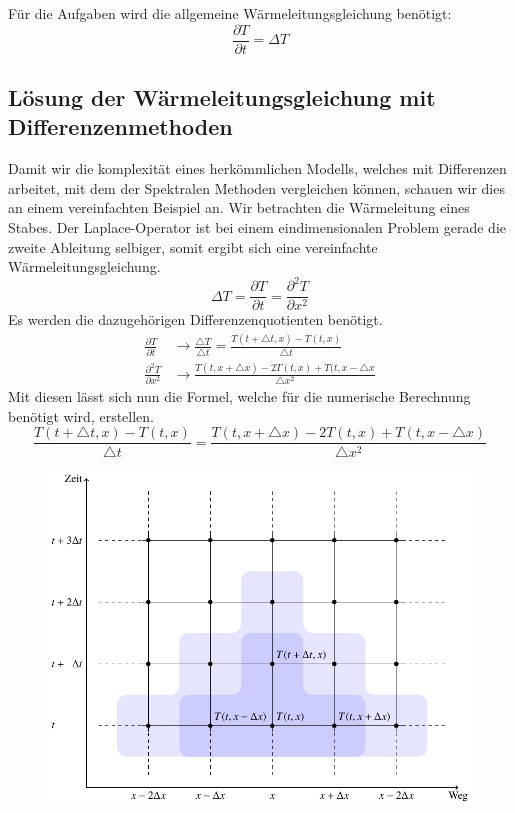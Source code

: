 \begin{refsection}
Für die Aufgaben wird die allgemeine Wärmeleitungsgleichung benötigt:
\begin{equation}
\frac{\partial T}{\partial t} =  \Delta T 
\label{klima:bsp:pdgl}
\end{equation}



\subsection{Lösung der Wärmeleitungsgleichung mit Differenzenmethoden}
Damit wir die komplexität eines herkömmlichen Modells, welches mit Differenzen arbeitet, mit dem der Spektralen Methoden vergleichen können, schauen wir dies an einem vereinfachten Beispiel an. Wir betrachten die Wärmeleitung eines Stabes.
Der Laplace-Operator ist bei einem eindimensionalen Problem gerade die zweite Ableitung selbiger, somit ergibt sich eine vereinfachte Wärmeleitungsgleichung.
\begin{equation}
\Delta T = \frac{\partial T}{\partial t}=\dfrac{\partial^2 T}{\partial x^2}
\end{equation}
Es werden die dazugehörigen Differenzenquotienten benötigt.
\begin{align}
\frac{\partial T}{\partial t}
&\rightarrow
\frac{\triangle T}{\triangle t}=
\frac{T(t+\triangle t,x)-T(t,x)}{\triangle t}
\\
\frac{\partial^2 T}{\partial x^2}
&\rightarrow
\frac{T(t,x+\triangle x)-2T(t,x)+T(t,x-\triangle x}{\triangle x^2}
\end{align}
Mit diesen lässt sich nun die Formel, welche für die numerische Berechnung benötigt wird, erstellen.
\begin{equation}
\frac{T(t+\triangle t,x)-T(t,x)}{\triangle t}
=
\frac{T(t,x+\triangle x)-2T(t,x)+T(t,x-\triangle x)}{\triangle x^2}
\label{klima:bsp:diff}
\end{equation}
\begin{figure}
\centering
\includegraphics[width=\hsize]{klima/differenzen.pdf}

\end{figure}
\end{refsection}
